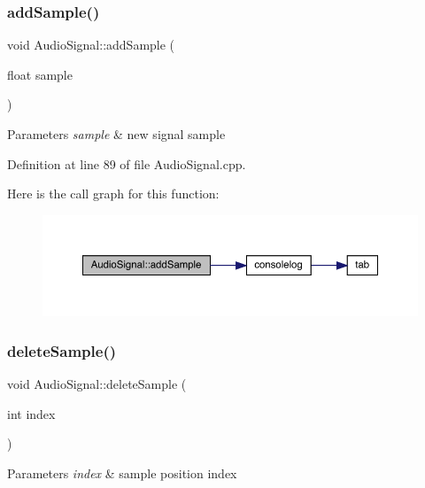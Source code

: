\subsubsection{\texorpdfstring{add\+Sample()}{addSample()}}
{\footnotesize\ttfamily void Audio\+Signal\+::add\+Sample (\begin{DoxyParamCaption}\item[{float}]{sample }\end{DoxyParamCaption})}


\begin{DoxyParams}{Parameters}
{\em sample} & new signal sample \\
\hline
\end{DoxyParams}


Definition at line 89 of file Audio\+Signal.\+cpp.

Here is the call graph for this function\+:
\nopagebreak
\begin{figure}[H]
\begin{center}
\leavevmode
\includegraphics[width=350pt]{class_audio_signal_a94c974f752e3045190944860bd8b0ad8_cgraph}
\end{center}
\end{figure}
\mbox{\label{class_audio_signal_aac1c34bc8bfcf31fdbac847e67cbea7f}} 
\subsubsection{\texorpdfstring{delete\+Sample()}{deleteSample()}\hspace{0.1cm}{\footnotesize\ttfamily [1/2]}}
{\footnotesize\ttfamily void Audio\+Signal\+::delete\+Sample (\begin{DoxyParamCaption}\item[{int}]{index }\end{DoxyParamCaption})}


\begin{DoxyParams}{Parameters}
{\em index} & sample position index \\
\hline
\end{DoxyParams}



